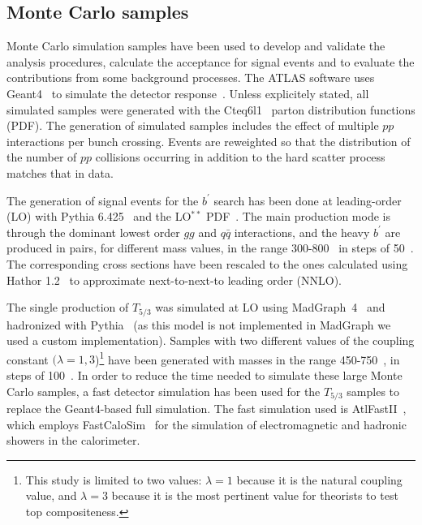 \subsection{Monte Carlo samples}\label{sect:MCsamples}
Monte Carlo simulation samples have been used to develop and validate the analysis procedures,
calculate the acceptance for signal events and to evaluate the contributions from some background
processes. The ATLAS software uses {\sc Geant4}~\cite{Agostinelli:2002hh} 
to simulate the detector response~\cite{Aad:2010ah}. Unless explicitely stated,
all simulated samples were generated with the {\sc Cteq6l1}~\cite{Pumplin:2002vw} parton distribution 
functions (PDF).
The generation of simulated samples includes the effect of multiple $pp$ interactions per bunch
crossing. Events are reweighted so that the distribution of the number of $pp$ collisions occurring
in addition to the hard scatter process matches that in data.

The generation of signal events for the $b^\prime$ search has been done at leading-order (LO) with
{\sc Pythia 6.425}~\cite{PYTHIA6.4} and the LO$^{**}$ PDF~\cite{Sherstnev:2008dm}.
The main production mode is through the dominant lowest order
$gg$ and $q\bar{q}$ interactions, and the heavy $b^\prime$ are produced in pairs, for different
mass values, in the range 300-800~\GeV{} in steps of 50~\GeV{}. 
The corresponding cross sections have been rescaled to the ones calculated 
using {\sc Hathor} 1.2~\cite{Aliev:2010zk} to approximate next-to-next-to leading 
order (NNLO).

The single production of $T_{5/3}$ was simulated at LO using {\sc MadGraph}~4~\cite{Alwall:2007st} and hadronized with 
{\sc Pythia}~\cite{PYTHIA6.4} (as this model is not implemented in
{\sc MadGraph} we used a custom implementation). Samples with two different
values of the coupling constant $(\lambda=1,3$)\footnote{This study is limited to two 
values: $\lambda=1$ because it is the natural coupling value, and $\lambda=3$ because it is the most
pertinent value for theorists to test top compositeness.} have been generated with
masses in the range 450-750~\GeV{}, in steps of 100~\GeV{}. In order to reduce
the time needed to simulate these large Monte Carlo samples, a fast detector simulation has been used for
the $T_{5/3}$ samples to replace the {\sc Geant4}-based full simulation. 
The fast simulation used is {\sc AtlFastII}~\cite{Richter-Was:683751}, which employs 
{\sc FastCaloSim}~\cite{Yamanaka:1322202} for the
simulation of electromagnetic and hadronic showers in the calorimeter.


